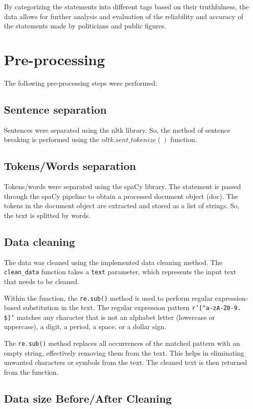 \documentclass[12pt]{article}
\begin{document}
By categorizing the statements into different tags based on their truthfulness, the data allows for further analysis and evaluation of the reliability and accuracy of the statements made by politicians and public figures.

\section{Pre-processing}

The following pre-processing steps were performed:

\subsection{Sentence separation}
Sentences were separated using the nltk library. So, the method of sentence breaking is performed using the $nltk.sent\_tokenize()$ function.

\subsection{Tokens/Words separation}
Tokens/words were separated using the spaCy library. The statement is passed through the spaCy pipeline to obtain a processed document object (doc). The tokens in the document object are extracted and stored as a list of strings. So, the text is splitted by words.

\subsection{Data cleaning}
 The data was cleaned using the implemented data cleaning method. The \texttt{clean\_data} function takes a \texttt{text} parameter, which represents the input text that needs to be cleaned.

Within the function, the \texttt{re.sub()} method is used to perform regular expression-based substitution in the text. The regular expression pattern \texttt{r'[\^{}a-zA-Z0-9. \$]'} matches any character that is not an alphabet letter (lowercase or uppercase), a digit, a period, a space, or a dollar sign.

The \texttt{re.sub()} method replaces all occurrences of the matched pattern with an empty string, effectively removing them from the text. This helps in eliminating unwanted characters or symbols from the text. The cleaned text is then returned from the function.

\subsection{Data size Before/After Cleaning}
\end{document}
